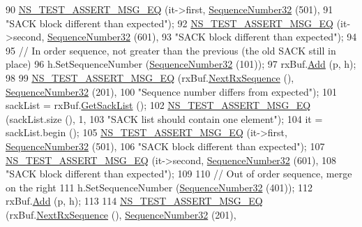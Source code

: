 \begin{DoxyCode}
90   \hyperlink{group__testing_ga2a9d78cffb3db8e867c35fff0b698cf5}{NS\_TEST\_ASSERT\_MSG\_EQ} (it->first, \hyperlink{classns3_1_1SequenceNumber}{SequenceNumber32} (501),
91                          \textcolor{stringliteral}{"SACK block different than expected"});
92   \hyperlink{group__testing_ga2a9d78cffb3db8e867c35fff0b698cf5}{NS\_TEST\_ASSERT\_MSG\_EQ} (it->second, \hyperlink{classns3_1_1SequenceNumber}{SequenceNumber32} (601),
93                          \textcolor{stringliteral}{"SACK block different than expected"});
94 
95   \textcolor{comment}{// In order sequence, not greater than the previous (the old SACK still in place)}
96   h.SetSequenceNumber (\hyperlink{classns3_1_1SequenceNumber}{SequenceNumber32} (101));
97   rxBuf.\hyperlink{classns3_1_1TcpRxBuffer_a35a036383b8976cb79738c28aa01d5d0}{Add} (p, h);
98 
99   \hyperlink{group__testing_ga2a9d78cffb3db8e867c35fff0b698cf5}{NS\_TEST\_ASSERT\_MSG\_EQ} (rxBuf.\hyperlink{classns3_1_1TcpRxBuffer_ae994bf90329d10f17b59d32907b04ca9}{NextRxSequence} (), 
      \hyperlink{group__network_gacb2070e4e98d2d5135c9bede58f07a03}{SequenceNumber32} (201),
100                          \textcolor{stringliteral}{"Sequence number differs from expected"});
101   sackList = rxBuf.\hyperlink{classns3_1_1TcpRxBuffer_afc5d672da4595330754de1bb3933a9c7}{GetSackList} ();
102   \hyperlink{group__testing_ga2a9d78cffb3db8e867c35fff0b698cf5}{NS\_TEST\_ASSERT\_MSG\_EQ} (sackList.size (), 1,
103                          \textcolor{stringliteral}{"SACK list should contain one element"});
104   it = sackList.begin ();
105   \hyperlink{group__testing_ga2a9d78cffb3db8e867c35fff0b698cf5}{NS\_TEST\_ASSERT\_MSG\_EQ} (it->first, \hyperlink{classns3_1_1SequenceNumber}{SequenceNumber32} (501),
106                          \textcolor{stringliteral}{"SACK block different than expected"});
107   \hyperlink{group__testing_ga2a9d78cffb3db8e867c35fff0b698cf5}{NS\_TEST\_ASSERT\_MSG\_EQ} (it->second, \hyperlink{classns3_1_1SequenceNumber}{SequenceNumber32} (601),
108                          \textcolor{stringliteral}{"SACK block different than expected"});
109 
110   \textcolor{comment}{// Out of order sequence, merge on the right}
111   h.SetSequenceNumber (\hyperlink{classns3_1_1SequenceNumber}{SequenceNumber32} (401));
112   rxBuf.\hyperlink{classns3_1_1TcpRxBuffer_a35a036383b8976cb79738c28aa01d5d0}{Add} (p, h);
113 
114   \hyperlink{group__testing_ga2a9d78cffb3db8e867c35fff0b698cf5}{NS\_TEST\_ASSERT\_MSG\_EQ} (rxBuf.\hyperlink{classns3_1_1TcpRxBuffer_ae994bf90329d10f17b59d32907b04ca9}{NextRxSequence} (), 
      \hyperlink{group__network_gacb2070e4e98d2d5135c9bede58f07a03}{SequenceNumber32} (201),

\end{DoxyCode}
